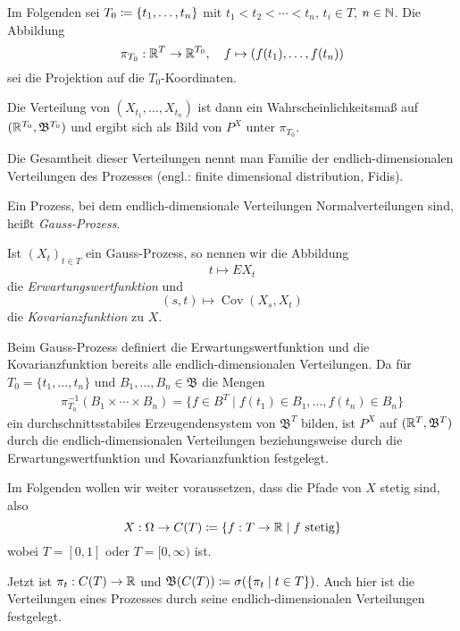 \documentclass[a4paper,twoside,DIV15,BCOR12mm]{scrbook}
\newcommand{\borel}{{\mathfrak B}}
\begin{document}
Im Folgenden sei $T_0 \da\{t_1,\ldots,t_n\}$ mit $t_1<t_2<\cdots<t_n$, $t_i\in T$, $n\in \mathbb{N}$. Die Abbildung
\[
\pi_{T_0}:\mathbb{R}^T \to \mathbb{R}^{T_0},\quad f\mapsto (f(t_1),\ldots,f(t_n))
\]
sei die Projektion auf die $T_{0}$-Koordinaten.

Die Verteilung von $(X_{t_1},\ldots,X_{t_n})$ ist dann ein Wahrscheinlichkeitsmaß auf $(\MdR^{T_0},\borel^{T_0})$ und ergibt sich als Bild von $P^X$ unter $\pi_{T_0}$.

Die Gesamtheit dieser Verteilungen nennt man Familie der endlich-dimensionalen Verteilungen des Prozesses (engl.: finite dimensional distribution, Fidis).

\begin{definition}
Ein Prozess, bei dem endlich-dimensionale Verteilungen Normalverteilungen sind, heißt \emph{Gauss-Prozess}.

Ist $(X_t)_{t\in T}$ ein Gauss-Prozess, so nennen wir die Abbildung \[ t\mapsto EX_t\] die \emph{Erwartungswertfunktion} und \[ (s,t)\mapsto \operatorname{Cov}(X_s,X_t)\] die \emph{Kovarianzfunktion} zu $X$.
\end{definition}

\begin{bemerkung}
Beim Gauss-Prozess definiert die Erwartungswertfunktion und die Kovarianzfunktion bereits alle endlich-dimensionalen Verteilungen. Da für $T_0=\{t_1,\ldots,t_n\}$ und $B_1,\ldots,B_n\in \borel$ die Mengen
\begin{align*}
\pi_{T_0}^{-1}(B_1\times \cdots \times B_n) = \{f\in B^T\mid f(t_1)\in B_1,\ldots,f(t_n)\in B_n\}
\end{align*}
ein durchschnittsstabiles Erzeugendensystem von $\borel^T$ bilden, ist $P^X$ auf $(\MdR^T,\borel^T)$ durch die endlich-dimensionalen Verteilungen beziehungsweise durch die Erwartungswertfunktion und Kovarianzfunktion festgelegt.
\end{bemerkung}

Im Folgenden wollen wir weiter voraussetzen, dass die Pfade von $X$ stetig sind, also 
\[
X: \Omega \to C(T) \da \{f:T\to \MdR\mid f\text{ stetig}\}
\]
wobei $T=[0,1]$ oder $T=[0,\infty)$ ist.

Jetzt ist $\pi_t : C(T) \to \mathbb{R}$ und $\borel(C(T)) \da \sigma(\{\pi_t \mid t\in T\})$. Auch hier ist die Verteilungen eines Prozesses durch seine endlich-dimensionalen Verteilungen festgelegt.
\end{document}
